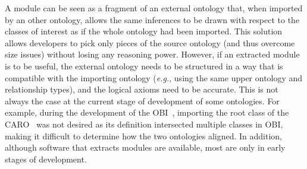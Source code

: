 \documentclass[jou]{ao2e}%
\begin{document}
A module can be seen as a fragment of an external ontology that, when imported by an other ontology, allows the same inferences to be drawn with respect to the classes of interest as if the whole ontology had been imported. This solution allows developers to pick only pieces of the source ontology (and thus overcome size issues) without losing any reasoning power.
However, if an extracted module is to be useful, the external ontology needs to be structured in a way that is compatible with the importing ontology (\emph{e.g.}, using the same upper ontology and relationship types), and the logical axioms need to be accurate. 
This is not always the case at the current stage of development of some ontologies.
For example, during the development of the \ac{OBI}~\citep{OBI}, importing the root class of the \ac{CARO}~\citep{CARO} was not desired as its definition intersected multiple classes in \ac{OBI}, making it difficult to determine how the two ontologies aligned. %
In addition, although software that extracts modules are available, most are only in early stages of development.
\end{document}
